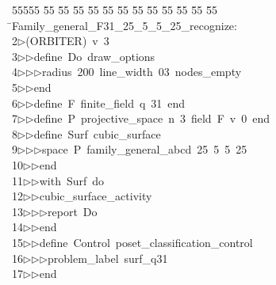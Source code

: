 %
%
\begin{tabbing}
55555 \= 55 \= 55 \= 55 \= 55 \= 55 \= 55 \= 55 \= 55 \= 55 \= 55 \= 55 \= 55 \= \>Family\_general\_F31\_25\_5\_5\_25\_recognize:\\[0pt]
2\>$\triangleright$\>(ORBITER)\ v\ 3\ \\[0pt]
3\>$\triangleright$\>$\triangleright$\>define\ Do\ draw\_options\ \\[0pt]
4\>$\triangleright$\>$\triangleright$\>$\triangleright$\>radius\ 200\ line\_width\ 03\ nodes\_empty\ \\[0pt]
5\>$\triangleright$\>$\triangleright$\>end\ \\[0pt]
6\>$\triangleright$\>$\triangleright$\>define\ F\ finite\_field\ q\ 31\ end\ \\[0pt]
7\>$\triangleright$\>$\triangleright$\>define\ P\ projective\_space\ n\ 3\ field\ F\ v\ 0\ end\ \\[0pt]
8\>$\triangleright$\>$\triangleright$\>define\ Surf\ cubic\_surface\ \\[0pt]
9\>$\triangleright$\>$\triangleright$\>$\triangleright$\>space\ P\ family\_general\_abcd\ 25\ 5\ 5\ 25\ \\[0pt]
10\>$\triangleright$\>$\triangleright$\>end\ \\[0pt]
11\>$\triangleright$\>$\triangleright$\>with\ Surf\ do\ \\[0pt]
12\>$\triangleright$\>$\triangleright$\>cubic\_surface\_activity\ \\[0pt]
13\>$\triangleright$\>$\triangleright$\>$\triangleright$\>report\ Do\ \\[0pt]
14\>$\triangleright$\>$\triangleright$\>end\ \\[0pt]
15\>$\triangleright$\>$\triangleright$\>define\ Control\ poset\_classification\_control\ \\[0pt]
16\>$\triangleright$\>$\triangleright$\>$\triangleright$\>problem\_label\ surf\_q31\ \\[0pt]
17\>$\triangleright$\>$\triangleright$\>end\ \\[0pt]

\end{tabbing}
